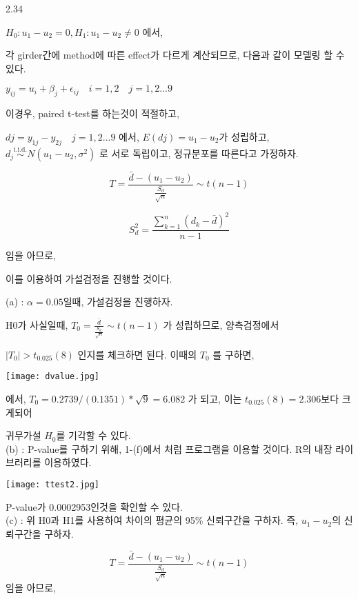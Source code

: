 \documentclass{article}
\begin{document}
2.34

$H_0 : u_1 - u_2 = 0, H_1 : u_1-u_2 \neq 0 $ 에서,

각 girder간에 method에 따른 effect가 다르게 계산되므로, 다음과 같이 모델링 할 수 있다.

$y_{ij} = u_i + \beta_j + \epsilon_{ij}  \quad  i = 1,2  \quad  j = 1, 2 ... 9 $

이경우, paired t-test를 하는것이 적절하고,

$dj = y_{1j} - y_{2j} \quad j = 1, 2... 9$ 에서,
$E(dj) = u_1 - u_2$가 성립하고, $d_j\overset{\text{i.i.d.}}{\sim} N(u_1 - u_2,\sigma^2)$ 로 서로 독립이고, 정규분포를 따른다고 가정하자.

$$ T = \frac{\bar{d} - (u_1 - u_2)}{\frac{S_d}{\sqrt{n}}} \sim t(n-1) $$

$$ S_d^{2} = \frac{\sum_{k=1}^{n}(d_k - \bar{d})^{2}}{n-1} $$

임을 아므로,

이를 이용하여 가설검정을 진행할 것이다.



(a) : $\alpha = 0.05$일때, 가설검정을 진행하자.

H0가 사실일때,  $T_0 = \frac{\bar{d}}{\frac{S_d}{\sqrt{n}}} \sim t(n-1) $ 가 성립하므로, 양측검정에서

$|T_0| > t_{0.025}(8)$ 인지를 체크하면 된다. 이때의 $T_0$ 를 구하면,

\begin{center}
    \texttt{[image: dvalue.jpg]}
\end{center} 

에서, $T_0 = 0.2739 / (0.1351) * \sqrt{9} = 6.082$ 가 되고, 이는 $t_{0.025}(8) = 2.306$보다 크게되어 

귀무가설 $H_0$를 기각할 수 있다. \\



(b) : P-value를 구하기 위해, 1-(f)에서 처럼 프로그램을 이용할 것이다.
      R의 내장 라이브러리를 이용하였다.

\begin{center}
    \texttt{[image: ttest2.jpg]}
\end{center} 

P-value가 0.0002953인것을 확인할 수 있다. \\



(c) : 위 H0과 H1를 사용하여 차이의 평균의 95\% 신뢰구간을 구하자. 즉, $u_1 - u_2$의 신뢰구간을 구하자.

$$ T = \frac{\bar{d} - (u_1 - u_2)}{\frac{S_d}{\sqrt{n}}} \sim t(n-1) $$ 임을 아므로,
\end{document}

